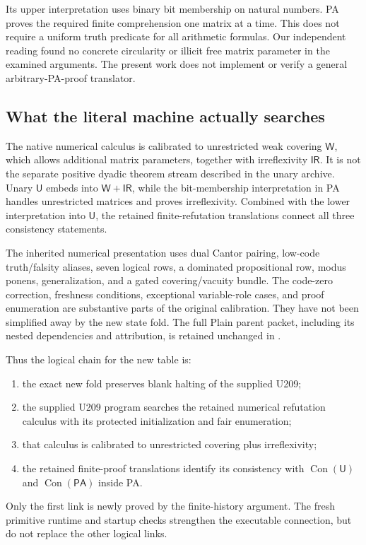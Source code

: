 \documentclass[11pt,letterpaper]{article}
\newcommand{\PA}{\mathsf{PA}}
\newcommand{\UU}{\mathsf U}
\newcommand{\WW}{\mathsf W}
\newcommand{\IR}{\mathsf{IR}}
\newcommand{\Con}{\operatorname{Con}}
\begin{document}
Its upper interpretation uses binary bit membership on natural numbers.
PA proves the required finite comprehension one matrix at a time. This
does not require a uniform truth predicate for all arithmetic formulas.
Our independent reading found no concrete circularity or illicit free
matrix parameter in the examined arguments. The present work does not
implement or verify a general arbitrary-PA-proof translator.

\subsection{What the literal machine actually searches}
The native numerical calculus is calibrated to unrestricted weak covering
$\WW$, which allows additional matrix parameters, together with
irreflexivity $\IR$. It is not the separate positive dyadic theorem stream
described in the unary archive. Unary $\UU$ embeds into $\WW+\IR$, while
the bit-membership interpretation in PA handles unrestricted matrices and
proves irreflexivity. Combined with the lower interpretation into $\UU$,
the retained finite-refutation translations connect all three consistency
statements.

The inherited numerical presentation uses dual Cantor pairing, low-code
truth/falsity aliases, seven logical rows, a dominated propositional row,
modus ponens, generalization, and a gated covering/vacuity bundle.
The code-zero correction, freshness conditions, exceptional variable-role
cases, and proof enumeration are substantive parts of the original
calibration. They have not been simplified away by the new state fold.
The full Plain parent packet, including its nested dependencies and
attribution, is retained unchanged in .

Thus the logical chain for the new table is:
\begin{enumerate}
\item the exact new fold preserves blank halting of the supplied U209;
\item the supplied U209 program searches the retained numerical
refutation calculus with its protected initialization and fair enumeration;
\item that calculus is calibrated to unrestricted covering plus
irreflexivity;
\item the retained finite-proof translations identify its consistency
with $\Con(\UU)$ and $\Con(\PA)$ inside PA.
\end{enumerate}
Only the first link is newly proved by the finite-history argument.
The fresh primitive runtime and startup checks strengthen the executable
connection, but do not replace the other logical links.
\end{document}
